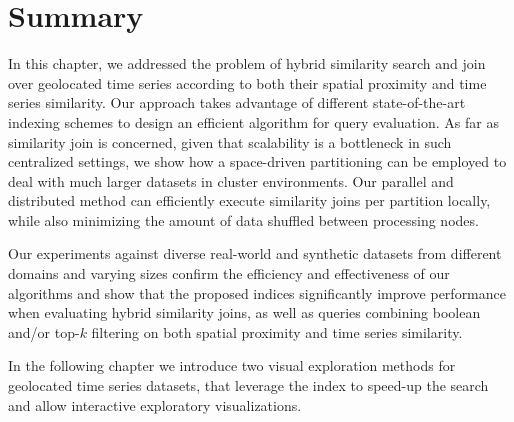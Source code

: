 
\graphicspath{{Papers/SIGSpatial2017/}{Papers/SIGSpatial2018/}}

\section{Summary}
\label{sec:concl_btsr_queries}

In this chapter, we addressed the problem of hybrid similarity search and join over geolocated time series according to both their spatial proximity and time series similarity. Our approach takes advantage of different state-of-the-art indexing schemes to design an efficient algorithm for query evaluation. As far as similarity join is concerned, given that scalability is a bottleneck in such centralized settings, we show how a space-driven partitioning can be employed to deal with much larger datasets in cluster environments. Our parallel and distributed method can efficiently execute similarity joins per partition locally, while also minimizing the amount of data shuffled between processing nodes.

Our experiments against diverse real-world and synthetic datasets from different domains and varying sizes confirm the efficiency and effectiveness of our algorithms and show that the proposed indices significantly improve performance when evaluating hybrid similarity joins, as well as queries combining boolean and/or top-$k$ filtering on both spatial proximity and time series similarity.

In the following chapter we introduce two visual exploration methods for geolocated time series datasets, that leverage the \btsr index to speed-up the search and allow interactive exploratory visualizations.
